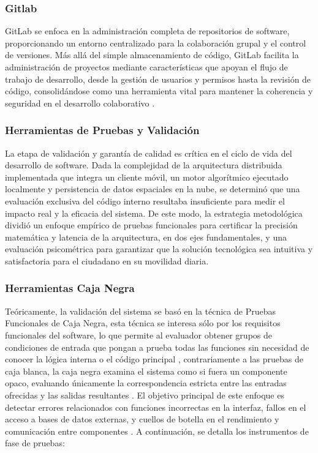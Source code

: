 \subsubsection*{\hspace{0.7cm}Gitlab}
GitLab se enfoca en la administración completa de repositorios de software, proporcionando un entorno centralizado para la colaboración grupal y el control de versiones. Más allá del simple almacenamiento de código, GitLab facilita la administración de proyectos mediante características que apoyan el flujo de trabajo de desarrollo, desde la gestión de usuarios y permisos hasta la revisión de código, consolidándose como una herramienta vital para mantener la coherencia y seguridad en el desarrollo colaborativo \cite{hethey2013gitlab}.

\subsubsection{Herramientas de Pruebas y Validación}
La etapa de validación y garantía de calidad es crítica en el ciclo de vida del desarrollo de software. Dada la complejidad de la arquitectura distribuida implementada que integra un cliente móvil, un motor algorítmico ejecutado localmente y persistencia de datos espaciales en la nube, se determinó que una evaluación exclusiva del código interno resultaba insuficiente para medir el impacto real y la eficacia del sistema. De este modo, la estrategia metodológica dividió un enfoque empírico de pruebas funcionales para certificar la precisión matemática y latencia de la arquitectura, en dos ejes fundamentales, y una evaluación psicométrica para garantizar que la solución tecnológica sea intuitiva y satisfactoria para el ciudadano en su movilidad diaria.
\subsubsection*{\hspace{0.7cm}Herramientas Caja Negra}
Teóricamente, la validación del sistema se basó en la técnica de Pruebas Funcionales de Caja Negra, esta técnica se interesa sólo por los requisitos funcionales del software, lo que permite al evaluador obtener grupos de condiciones de entrada que pongan a prueba todas las funciones sin necesidad de conocer la lógica interna o el código principal  \cite{pressman2005software}, contrariamente a las pruebas de caja blanca, la caja negra examina el sistema como si fuera un componente opaco, evaluando únicamente la correspondencia estricta entre las entradas ofrecidas y las salidas resultantes \cite{sommerville2011software}.
El objetivo principal de este enfoque es detectar errores relacionados con funciones incorrectas en la interfaz, fallos en el acceso a bases de datos externas, y cuellos de botella en el rendimiento y comunicación entre componentes \cite{myers2006art}. A continuación, se detalla los instrumentos de fase de pruebas:

